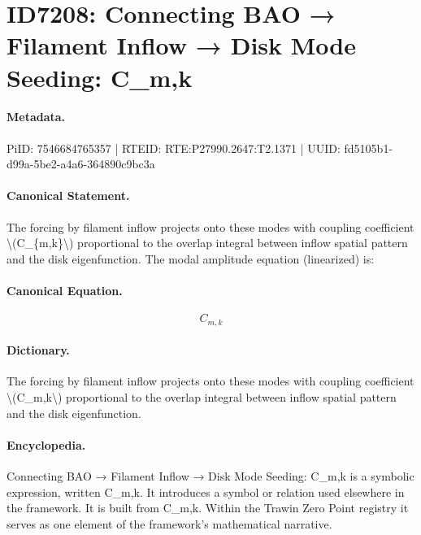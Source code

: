 \section*{ID7208: Connecting BAO → Filament Inflow → Disk Mode Seeding: C\_m,k}
\paragraph{Metadata.}
PiID: 7546684765357 | RTEID: RTE:P27990.2647:T2.1371 | UUID: fd5105b1-d99a-5be2-a4a6-364890c9bc3a

\paragraph{Canonical Statement.}
The forcing by filament inflow projects onto these modes with coupling coefficient \textbackslash{}(C\_\{m,k\}\textbackslash{}) proportional to the overlap integral between inflow spatial pattern and the disk eigenfunction. The modal amplitude equation (linearized) is:

\paragraph{Canonical Equation.}
\[
C_{m,k}
\]

\paragraph{Dictionary.}
The forcing by filament inflow projects onto these modes with coupling coefficient \textbackslash{}(C\_m,k\textbackslash{}) proportional to the overlap integral between inflow spatial pattern and the disk eigenfunction.

\paragraph{Encyclopedia.}
Connecting BAO → Filament Inflow → Disk Mode Seeding: C\_m,k is a symbolic expression, written C\_m,k. It introduces a symbol or relation used elsewhere in the framework. It is built from C\_m,k. Within the Trawin Zero Point registry it serves as one element of the framework's mathematical narrative.

